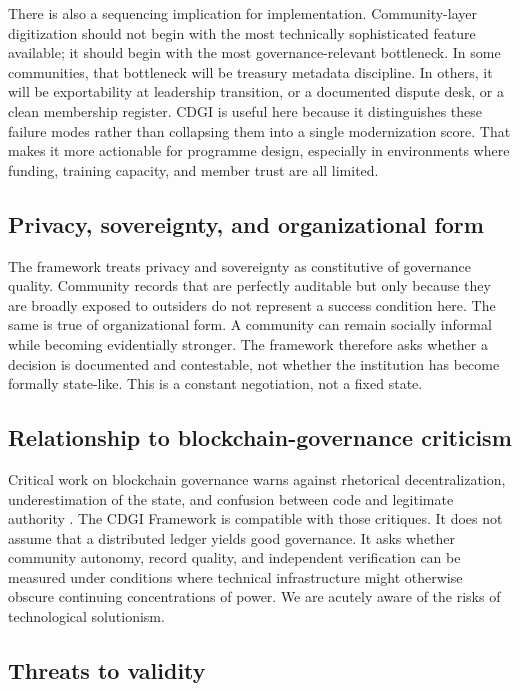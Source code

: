 \documentclass[sigconf]{acmart}
\begin{document}
There is also a sequencing implication for implementation. Community-layer digitization should not begin with the most technically sophisticated feature available; it should begin with the most governance-relevant bottleneck. In some communities, that bottleneck will be treasury metadata discipline. In others, it will be exportability at leadership transition, or a documented dispute desk, or a clean membership register. CDGI is useful here because it distinguishes these failure modes rather than collapsing them into a single modernization score. That makes it more actionable for programme design, especially in environments where funding, training capacity, and member trust are all limited.

\subsection{Privacy, sovereignty, and organizational form}

The framework treats privacy and sovereignty as constitutive of governance quality. Community records that are perfectly auditable but only because they are broadly exposed to outsiders do not represent a success condition here. The same is true of organizational form. A community can remain socially informal while becoming evidentially stronger. The framework therefore asks whether a decision is documented and contestable, not whether the institution has become formally state-like. This is a constant negotiation, not a fixed state.

\subsection{Relationship to blockchain-governance criticism}

Critical work on blockchain governance warns against rhetorical decentralization, underestimation of the state, and confusion between code and legitimate authority \cite{atzori2017, schneider2019}. The CDGI Framework is compatible with those critiques. It does not assume that a distributed ledger yields good governance. It asks whether community autonomy, record quality, and independent verification can be measured under conditions where technical infrastructure might otherwise obscure continuing concentrations of power. We are acutely aware of the risks of technological solutionism.

\subsection{Threats to validity}
\end{document}
